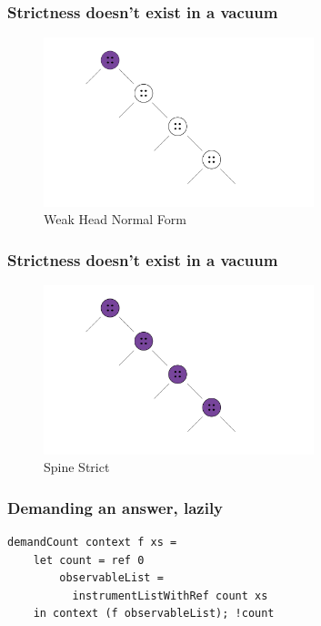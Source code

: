 \documentclass{beamer}
\begin{document}
\begin{frame}[fragile]
\frametitle{Strictness doesn't exist in a vacuum}
\begin{figure}
\centering
\includegraphics[width=0.7\textwidth]{whnf}
\caption{Weak Head Normal Form}
\end{figure}
\end{frame}

\begin{frame}[fragile]
\frametitle{Strictness doesn't exist in a vacuum}
\begin{figure}
\centering
\includegraphics[width=0.7\textwidth]{spinestrict}
\caption{Spine Strict}
\end{figure}
\end{frame}


\begin{frame}[fragile]
\frametitle{Demanding an answer, lazily}
\begin{verbatim}
demandCount context f xs =
    let count = ref 0
        observableList =
          instrumentListWithRef count xs
    in context (f observableList); !count
\end{verbatim}
\end{frame}
\end{document}
